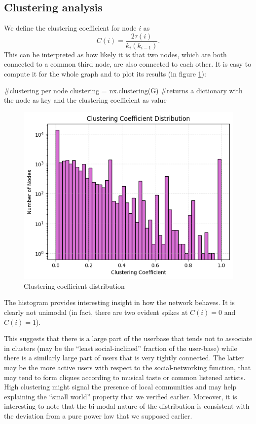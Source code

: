 \documentclass[12pt]{article}
\begin{document}
\subsection{Clustering analysis}
We define the clustering coefficient for node $i$ as 
\begin{equation*}
	C(i)=\frac{2\tau(i)}{k_{i}(k_{i-1})}.
\end{equation*}
This can be interpreted as how likely it is that two nodes, which are both connected to a common third node, are also connected to each other. It is easy to compute it for the whole graph and to plot its results (in figure \ref{fig:screenshot004}):
\begin{py}
	#clustering per node
	clustering = nx.clustering(G)  #returns a dictionary with the node as key and the clustering coefficient as value
\end{py}
\begin{figure}[h]
	\centering
	\includegraphics[width=0.6\linewidth]{screenshot004}
	\caption{Clustering coefficient distribution}
	\label{fig:screenshot004}
\end{figure}
The histogram provides interesting insight in how the network behaves. It is clearly not unimodal (in fact, there are two evident spikes at $C(i)=0$ and $C(i)=1$). \par
This suggests that there is a large part of the userbase that tends not to associate in clusters (may be the ``least social-inclined'' fraction of the user-base) while there is a similarly large part of users that is very tightly connected. The latter may be the more active users with respect to the social-networking function, that may tend to form cliques according to musical taste or common listened artists. High clustering might signal the presence of local communities and may help explaining the ``small world'' property that we verified earlier. Moreover, it is interesting to note that the bi-modal nature of the distribution is consistent with the deviation from a pure power law that we supposed earlier.
\end{document}
